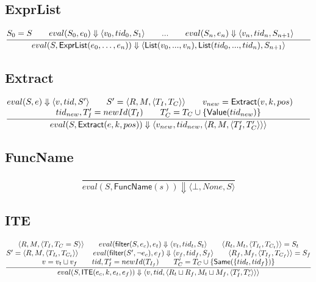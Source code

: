 \documentclass{article}
\newcommand{\eval}[3]{eval(#1,#2) \Downarrow #3}
\newcommand{\join}{\sqcup}
\newcommand{\filter}{\mathsf{filter}}
\begin{document}
\subsection{ExprList}
\[
\frac{
    \begin{array}{@{}c@{}}
        S_0 = S \qquad
        
        \eval{S_0}{e_0}{\langle v_0,tid_0,S_{1}\rangle}\qquad
        ...\qquad
        \eval{S_n}{e_n}{\langle v_n,tid_n,S_{n+1}\rangle}\qquad
    \end{array}
}{
    \eval{S}{\mathsf{ExprList}(e_0,\ldots,e_n)}
    {\langle \mathsf{List}(v_0, ..., v_n), \mathsf{List}(tid_0, ..., tid_n), S_{n+1} \rangle}
}
\]

\subsection{Extract}
\[
\frac{
\begin{array}{@{}c@{}}
    \eval{S}{e}{\langle v,tid,S'\rangle}\qquad
    S'=\langle R,M,\langle T_I,T_C\rangle\rangle \qquad
    v_{new}=\mathsf{Extract}(v,k,pos)\qquad\\
    tid_{new}, T_I' = newId(T_I)\qquad
    T_C'=T_C \cup \{\mathsf{Value}(tid_{new})\}
\end{array}
}
{
    \eval{S}{\mathsf{Extract}(e,k,pos)}
    {\langle v_{new}, tid_{new},\langle R,M,\langle T_I',T_C'\rangle\rangle\rangle}
}
\]

\subsection{FuncName}
\[
\frac{
}{
    \eval{S}{\mathsf{FuncName}(s)}
    {\langle \bot, None,S \rangle}
}
\]

\subsection{ITE}
\[
\frac{
\begin{array}{@{}c@{}}
    \langle R, M, \langle T_I, T_C = S \rangle \rangle \qquad
    \eval{\filter(S,e_c)}{e_t}{\langle v_t,tid_t,S_t\rangle}\qquad
    \langle R_t, M_t, \langle T_{I_t}, T_{C_t} \rangle \rangle = S_t \\
    
    S'=\langle R, M, \langle T_{I_t}, T_{C_t} \rangle \rangle \qquad
    \eval{\filter(S',\neg e_c)}{e_f}{\langle v_f,tid_f,S_f\rangle}\qquad
    \langle R_f, M_f, \langle T_{I_f}, T_{C_f} \rangle \rangle = S_f\\

    v=v_t \join v_f\qquad tid, T_I'=newId(T_{I_f})\qquad
    T_C'=T_C \cup \{\mathsf{Same}(\{tid_t, tid_f\})\}
\end{array}
}{
    \eval{S}{\mathsf{ITE}(e_c,k,e_t,e_f)}
    {\langle v,tid,\langle R_t \join R_f, M_t \join M_f, \langle T_I', T_c' \rangle \rangle\rangle}
}
\]
\end{document}
